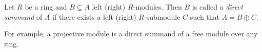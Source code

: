 \documentclass[12pt]{article}
\begin{document}
Let $R$ be a ring and $B\subseteq A$ left (right) $R$-modules.  Then $B$ is called a \emph{direct summand} of $A$ if there exists a left (right) $R$-submodule $C$ such that $A=B\oplus C$.

For example, a projective module is a direct summand of a free module over any ring.
\end{document}
